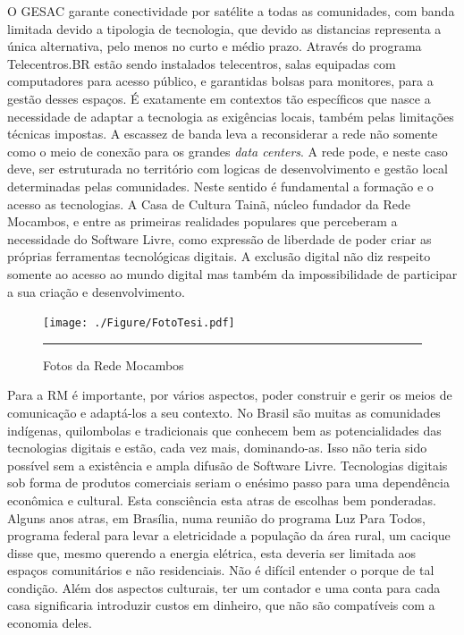 O GESAC garante conectividade por satélite a todas as comunidades, com
banda limitada devido a tipologia de tecnologia, que devido as
distancias representa a única alternativa, pelo menos no curto e médio
prazo. Através do programa Telecentros.BR estão sendo instalados
telecentros, salas equipadas com computadores para acesso público, e
garantidas bolsas para monitores, para a gestão desses espaços. É
exatamente em contextos tão específicos que nasce a necessidade de
adaptar a tecnologia as exigências locais, também pelas limitações
técnicas impostas. A escassez de banda leva a reconsiderar a rede não
somente como o meio de conexão para os grandes \emph{data centers}. A
rede pode, e neste caso deve, ser estruturada no território com
logicas de desenvolvimento e gestão local determinadas pelas
comunidades. Neste sentido é fundamental a formação e o acesso as
tecnologias. A Casa de Cultura Tainã, núcleo fundador da Rede
Mocambos, e entre as primeiras realidades populares que perceberam a
necessidade do Software Livre, como expressão de liberdade de poder
criar as próprias ferramentas tecnológicas digitais. A exclusão
digital não diz respeito somente ao acesso ao mundo digital mas também
da impossibilidade de participar a sua criação e desenvolvimento.




\begin{figure}[htbp]
  \centering
  \texttt{[image: ./Figure/FotoTesi.pdf]}
  \rule{35em}{0.5pt}
  \caption[Fotos da Rede Mocambos]{Fotos da Rede Mocambos}
  \label{fig:FotoRM}
\end{figure}

Para a RM é importante, por vários aspectos, poder construir e gerir
os meios de comunicação e adaptá-los a seu contexto. No Brasil são
muitas as comunidades indígenas, quilombolas e tradicionais que
conhecem bem as potencialidades das tecnologias digitais e estão, cada
vez mais, dominando-as. Isso não teria sido possível sem a existência
e ampla difusão de Software Livre. Tecnologias digitais sob forma de
produtos comerciais seriam o enésimo passo para uma dependência
econômica e cultural. Esta consciência esta atras de escolhas bem
ponderadas. Alguns anos atras, em Brasília, numa reunião do programa
Luz Para Todos, programa federal para levar a eletricidade a população
da área rural, um cacique disse que, mesmo querendo a energia
elétrica, esta deveria ser limitada aos espaços comunitários e não
residenciais. Não é difícil entender o porque de tal condição. Além
dos aspectos culturais, ter um contador e uma conta para cada casa
significaria introduzir custos em dinheiro, que não são compatíveis
com a economia deles.

